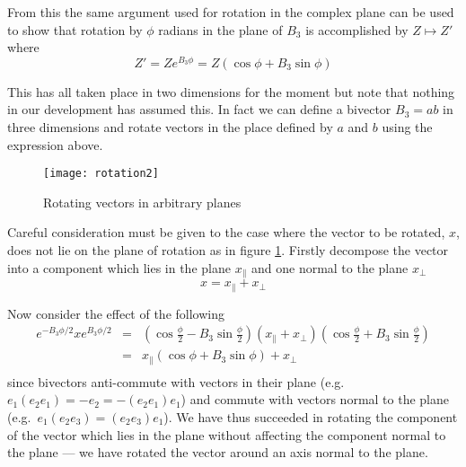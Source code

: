 From this the same argument used for rotation in the complex plane 
can be used to show that rotation by
$\phi$ radians in the plane of $B_3$ is accomplished by $Z \mapsto Z'$
where
\begin{displaymath}
Z' = Ze^{B_3\phi} = Z (\cos \phi + B_3 \sin \phi)
\end{displaymath}

This has all taken place in two dimensions for the moment but note that nothing
in our development has assumed this. In fact we can define a bivector $B_3 = ab$ in
three dimensions and rotate vectors in the place defined by $a$ and $b$ using
the expression above.

\begin{figure}
\centering
\texttt{[image: rotation2]}
\caption{Rotating vectors in arbitrary planes\label{fig:rotation2}}
\end{figure}

Careful consideration must be given to the case where the vector to be
rotated, $x$, does not lie on the plane of rotation as in figure
\ref{fig:rotation2}. Firstly decompose the
vector into a component which lies in the plane $x_\parallel$ and one
normal to the plane $x_\perp$
\[
x = x_\parallel + x_\perp
\]

Now consider the effect of the following
\begin{eqnarray*}
e^{-B_3\phi/2}
x
e^{B_3\phi/2}
& = & \left(\cos \frac{\phi}{2} - B_3 \sin \frac{\phi}{2}\right)
(x_\parallel + x_\perp )
\left(\cos \frac{\phi}{2} + B_3 \sin \frac{\phi}{2}\right) \\
& = & x_\parallel (\cos \phi + B_3 \sin \phi) + x_\perp\\ 
\end{eqnarray*}
since bivectors anti-commute with vectors in their plane (e.g. 
$e_1(e_2e_1) = -e_2 = -(e_2e_1)e_1$) and commute with
vectors normal to the plane (e.g.\ $e_1(e_2e_3) = (e_2e_3)e_1$).
We have thus succeeded in rotating the component of the vector 
which lies in the plane without affecting the component normal
to the plane --- we have rotated the vector around an axis normal to
the plane.


